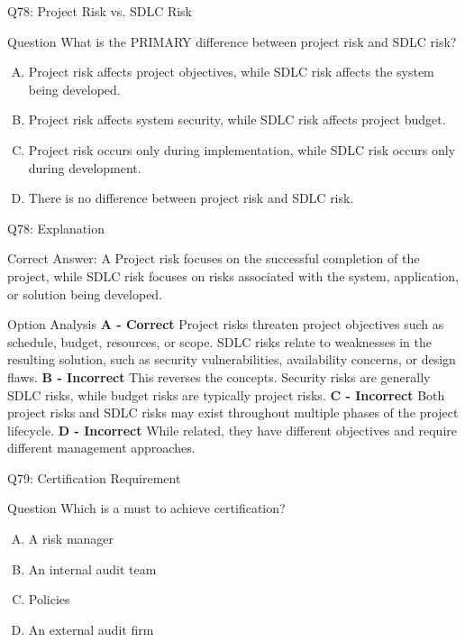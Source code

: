 \documentclass{beamer}
\begin{document}
	
	\begin{frame}{Q78: Project Risk vs. SDLC Risk} \begin{block}{Question} What is the PRIMARY difference between project risk and SDLC risk? \end{block} \begin{enumerate}[(A)] \item Project risk affects project objectives, while SDLC risk affects the system being developed. \item Project risk affects system security, while SDLC risk affects project budget. \item Project risk occurs only during implementation, while SDLC risk occurs only during development. \item There is no difference between project risk and SDLC risk. \end{enumerate} \end{frame} \begin{frame}{Q78: Explanation} \footnotesize \begin{block}{Correct Answer: A} Project risk focuses on the successful completion of the project, while SDLC risk focuses on risks associated with the system, application, or solution being developed. \end{block} \begin{block}{Option Analysis} \textbf{A - Correct} Project risks threaten project objectives such as schedule, budget, resources, or scope. SDLC risks relate to weaknesses in the resulting solution, such as security vulnerabilities, availability concerns, or design flaws. \vspace{0.15cm} \textbf{B - Incorrect} This reverses the concepts. Security risks are generally SDLC risks, while budget risks are typically project risks. \vspace{0.15cm} \textbf{C - Incorrect} Both project risks and SDLC risks may exist throughout multiple phases of the project lifecycle. \vspace{0.15cm} \textbf{D - Incorrect} While related, they have different objectives and require different management approaches. \end{block}  \end{frame}
	
	\begin{frame}{Q79: Certification Requirement}
		\begin{block}{Question}
			Which is a must to achieve certification?
		\end{block}
		\begin{enumerate}[(A)]
			\item A risk manager
			\item An internal audit team
			\item Policies
			\item An external audit firm
		\end{enumerate}
	\end{frame}
	
\end{document}
